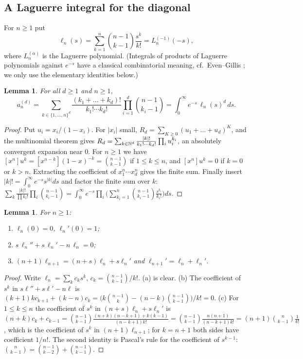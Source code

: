 \documentclass[11pt]{amsart}
\newtheorem{lemma}[theorem]{Lemma}
\theoremstyle{definition}
\theoremstyle{remark}
\begin{document}
\subsection{A Laguerre integral for the diagonal}\label{R1:sec:laguerre}

For $n\ge1$ put
\begin{equation}\label{R1:eq:ell}
\ell_n(s)=\sum_{k=1}^{n}\binom{n-1}{k-1}\frac{s^k}{k!}=L^{(-1)}_n(-s),
\end{equation}
where $L^{(\alpha)}_n$ is the Laguerre polynomial. (Integrals of products of Laguerre polynomials against
$e^{-s}$ have a classical combinatorial meaning, cf.\ Even--Gillis \cite{R1-EG}; we only use the elementary
identities below.)

\begin{lemma}\label{R1:lem:rep}
For all $d\ge1$ and $n\ge1$,
\[
a^{(d)}_n=\sum_{k\in\{1,\dots,n\}^d}\frac{(k_1+\dots+k_d)!}{k_1!\cdots k_d!}
\prod_{i=1}^{d}\binom{n-1}{k_i-1}
=\int_0^\infty e^{-s}\,\ell_n(s)^d\,ds .
\]
\end{lemma}

\begin{proof}
Put $u_i=x_i/(1-x_i)$. For $|x_i|$ small, $R_d=\sum_{K\ge0}(u_1+\dots+u_d)^K$, and the
multinomial theorem gives $R_d=\sum_{k\in\mathbb{N}^d}\frac{|k|!}{k_1!\cdots k_d!}\prod_iu_i^{k_i}$,
an absolutely convergent expansion near $0$. For $n\ge1$ we have $[x^n]u^k=[x^{n-k}](1-x)^{-k}
=\binom{n-1}{k-1}$ if $1\le k\le n$, and $[x^n]u^k=0$ if $k=0$ or $k>n$. Extracting the
coefficient of $x_1^n\cdots x_d^n$ gives the finite sum. Finally insert
$|k|!=\int_0^\infty e^{-s}s^{|k|}ds$ and factor the finite sum over $k$:
$\sum_k\frac{|k|!}{\prod k_i!}\prod_i\binom{n-1}{k_i-1}=\int_0^\infty e^{-s}
\prod_i\bigl(\sum_{k_i=1}^n\binom{n-1}{k_i-1}\frac{s^{k_i}}{k_i!}\bigr)ds$.
\end{proof}

\begin{lemma}\label{R1:lem:ell}
For $n\ge1$:
\begin{enumerate}
\item[(a)] $\ell_n(0)=0$, $\ell_n'(0)=1$;
\item[(b)] $s\,\ell_n''+s\,\ell_n'-n\,\ell_n=0$;
\item[(c)] $(n+1)\ell_{n+1}=(n+s)\ell_n+s\ell_n'$ and $\ell_{n+1}'=\ell_n+\ell_n'$.
\end{enumerate}
\end{lemma}

\begin{proof}
Write $\ell_n=\sum_kc_ks^k$, $c_k=\binom{n-1}{k-1}/k!$. (a) is clear. (b) The coefficient of
$s^k$ in $s\ell''+s\ell'-n\ell$ is $(k+1)kc_{k+1}+(k-n)c_k=\bigl(k\binom{n-1}{k}-(n-k)
\binom{n-1}{k-1}\bigr)/k!=0$. (c) For $1\le k\le n$ the coefficient of $s^k$ in $(n+s)\ell_n+s\ell_n'$ is
$(n+k)c_k+c_{k-1}=\binom{n-1}{k-1}\frac{(n+k)(n-k+1)+k(k-1)}{(n-k+1)k!}
=\binom{n-1}{k-1}\frac{n(n+1)}{(n-k+1)k!}=(n+1)\binom{n}{k-1}\frac1{k!}$, which is the
coefficient of $s^k$ in $(n+1)\ell_{n+1}$; for $k=n+1$ both sides have coefficient $1/n!$. The second identity is Pascal's rule for the
coefficient of $s^{k-1}$: $\binom{n}{k-1}=\binom{n-1}{k-2}+\binom{n-1}{k-1}$.
\end{proof}
\end{document}
